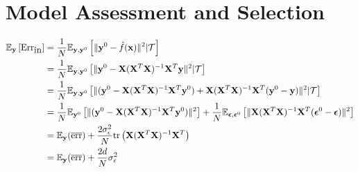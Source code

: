 \chapter{Model Assessment and Selection}
\label{ch:7}

\begin{exercise}
  \begin{align}
    \mathbb{E}_{\mathbf{y}}\left[\mbox{Err}_{\mbox{in}}\right] &= \frac{1}{N}
    \mathbb{E}_{\mathbf{y},
    \mathbf{y}^0}\left[\|\mathbf{y}^0 - \hat{f}(\mathbf{x})\|^2|\mathcal{T} \right] \notag \\
    &= \frac{1}{N}
    \mathbb{E}_{\mathbf{y},\mathbf{y}^0}\left[
    \|\mathbf{y}^0 -
    \mathbf{X}(\mathbf{X}^T\mathbf{X})^{-1}\mathbf{X}^T\mathbf{y}\|^2|\mathcal{T}
     \right] \notag \\
    &= \frac{1}{N}
    \mathbb{E}_{\mathbf{y},\mathbf{y}^0}\left[\|(\mathbf{y}^0 -
    \mathbf{X}(\mathbf{X}^T\mathbf{X})^{-1}\mathbf{X}^T\mathbf{y}^0) + 
     \mathbf{X}(\mathbf{X}^T\mathbf{X})^{-1}\mathbf{X}^T(\mathbf{y}^0 -
     \mathbf{y})\|^2|\mathcal{T}
    \right] \notag \\
    &= \frac{1}{N} \mathbb{E}_{\mathbf{y}^0} \left[\|(\mathbf{y}^0 -
    \mathbf{X}(\mathbf{X}^T\mathbf{X})^{-1}\mathbf{X}^T\mathbf{y}^0)\|^2\right]
    +
    \frac{1}{N}
    \mathbb{E}_{\bm{\epsilon}, \bm{\epsilon}^0}\left[
    \|\mathbf{X}(\mathbf{X}^T\mathbf{X})^{-1}\mathbf{X}^T(\bm{\epsilon}^0 -
    \bm{\epsilon})\|^2 \right] \notag\\
    &= \mathbb{E}_{\mathbf{y}}(\overline{\mbox{err}}) +
    \frac{2\sigma_{\epsilon}^2}{N}\mbox{tr}\left(\mathbf{X}(\mathbf{X}^T\mathbf{X})^{-1}\mathbf{X}^T
    \right) \notag\\
    &= \mathbb{E}_{\mathbf{y}}(\overline{\mbox{err}}) +
    \frac{2d}{N}\sigma_{\epsilon}^2
  \end{align}
\end{exercise}

